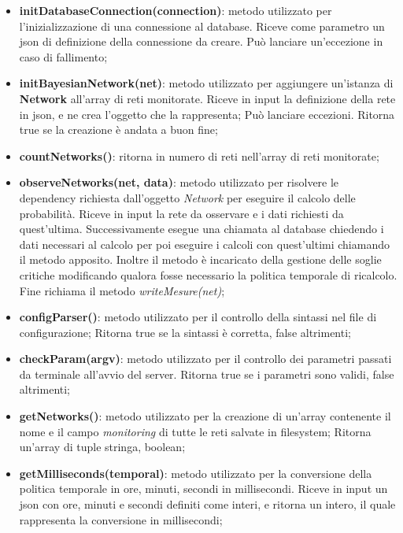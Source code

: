 \begin{itemize}
	 \item \textbf{initDatabaseConnection(connection)}: metodo utilizzato per l'inizializzazione di una 
	 connessione al database. Riceve come parametro un json di definizione della connessione da creare. 
	 Può lanciare un'eccezione in caso di fallimento;

	 \item \textbf{initBayesianNetwork(net)}: metodo utilizzato per aggiungere un'istanza di \textbf{Network}
	 all'array di reti monitorate. Riceve in input la definizione della rete in json, e ne crea l'oggetto che la rappresenta; Può lanciare eccezioni. Ritorna true se la creazione è andata a buon fine; 

	\item \textbf{countNetworks()}: ritorna in numero di reti nell'array di reti monitorate; 

	\item \textbf{observeNetworks(net, data)}: metodo utilizzato per risolvere le dependency richiesta
	dall'oggetto \textit{Network} per eseguire il calcolo delle probabilità. Riceve in input la rete da osservare
	e i dati richiesti da quest'ultima. Successivamente esegue una chiamata al database chiedendo i dati 
	necessari al calcolo per poi eseguire i calcoli con quest'ultimi chiamando il metodo apposito. Inoltre 
	il metodo è incaricato della gestione delle soglie critiche modificando qualora fosse necessario 
	la politica temporale di ricalcolo. Fine richiama il metodo \textit{writeMesure(net)}; 

	\item \textbf{configParser()}: metodo utilizzato per il controllo  della sintassi nel file di configurazione; 
	Ritorna true se la sintassi è corretta, false altrimenti; 

	\item \textbf{checkParam(argv)}: metodo utilizzato per il controllo dei parametri passati da terminale
	all'avvio del server. Ritorna true se i parametri sono validi, false altrimenti; 

	\item \textbf{getNetworks()}: metodo utilizzato per la creazione di un'array contenente il nome e 
	il campo \textit{monitoring} di tutte le reti salvate in filesystem; Ritorna un'array di tuple stringa, boolean; 

	\item \textbf{getMilliseconds(temporal)}: metodo utilizzato per la conversione della politica temporale in 
	ore, minuti, secondi in millisecondi. Riceve in input un json con ore, minuti e secondi definiti come interi, 
	e ritorna un intero, il quale rappresenta la conversione in millisecondi; 


\end{itemize}
